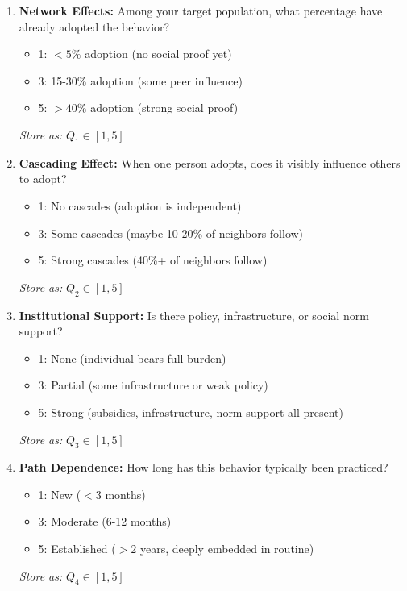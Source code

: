 \documentclass[11pt, a4paper]{article}
\begin{document}
\begin{enumerate}
    \item \textbf{Network Effects:}
    Among your target population, what percentage have already adopted the behavior?
    \begin{itemize}
        \item 1: $< 5\%$ adoption (no social proof yet)
        \item 3: 15-30\% adoption (some peer influence)
        \item 5: $> 40\%$ adoption (strong social proof)
    \end{itemize}
    \textit{Store as:} $Q_1 \in [1, 5]$

    \item \textbf{Cascading Effect:}
    When one person adopts, does it visibly influence others to adopt?
    \begin{itemize}
        \item 1: No cascades (adoption is independent)
        \item 3: Some cascades (maybe 10-20\% of neighbors follow)
        \item 5: Strong cascades (40\%+ of neighbors follow)
    \end{itemize}
    \textit{Store as:} $Q_2 \in [1, 5]$

    \item \textbf{Institutional Support:}
    Is there policy, infrastructure, or social norm support?
    \begin{itemize}
        \item 1: None (individual bears full burden)
        \item 3: Partial (some infrastructure or weak policy)
        \item 5: Strong (subsidies, infrastructure, norm support all present)
    \end{itemize}
    \textit{Store as:} $Q_3 \in [1, 5]$

    \item \textbf{Path Dependence:}
    How long has this behavior typically been practiced?
    \begin{itemize}
        \item 1: New ($< 3$ months)
        \item 3: Moderate (6-12 months)
        \item 5: Established ($> 2$ years, deeply embedded in routine)
    \end{itemize}
    \textit{Store as:} $Q_4 \in [1, 5]$
\end{enumerate}
\end{document}
